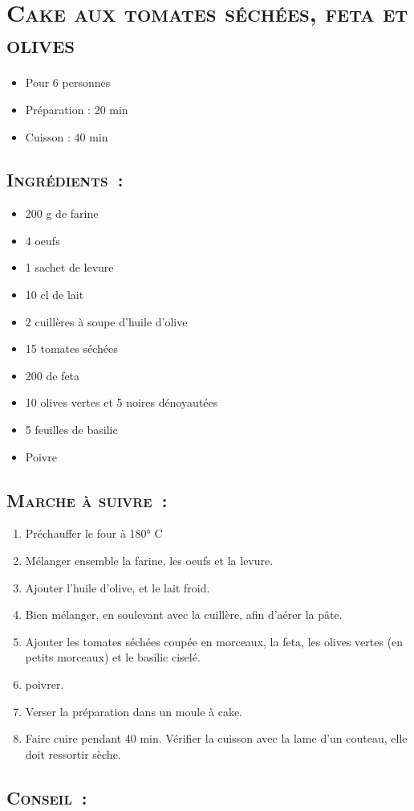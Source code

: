 \section[\normalsize{Cake aux tomates s\'ech\'ees, feta et olives}]{\LARGE{\textsc{Cake aux tomates s\'ech\'ees, feta et olives}}}		%


\begin{itemize}
\item Pour 6 personnes
\item Préparation : 20 min
\item Cuisson : 40 min
\end{itemize}

\subsection*{\textsc{Ingr\'edients~:}}

\begin{itemize}
\item 200 g de farine
\item 4 oeufs
\item 1 sachet de levure
\item 10 cl de lait
\item 2 cuill\`eres \`a soupe d'huile d'olive
\item 15 tomates s\'ech\'ees
\item 200 de feta
\item 10 olives vertes et 5 noires d\'enoyaut\'ees
\item 5 feuilles de basilic
\item Poivre
\end{itemize}


\subsection*{\textsc{Marche \`a suivre~:}}

\begin{enumerate}
\item Pr\'echauffer le four \`a 180° C

\item M\'elanger ensemble la farine, les oeufs et la levure.

\item Ajouter l'huile d'olive, et le lait froid.

\item Bien m\'elanger, en soulevant avec la cuill\`ere, afin d'a\'erer la p\^ate.

\item Ajouter les tomates s\'ech\'ees coup\'ee en morceaux, la feta, les olives vertes (en petits morceaux) et le basilic cisel\'e. 
\item poivrer.
\item Verser la pr\'eparation dans un moule \`a cake.
\item Faire cuire pendant 40 min. V\'erifier la cuisson avec la lame d'un couteau, elle doit ressortir s\`eche.

\end{enumerate}
\subsection*{\textsc{Conseil~:}}

